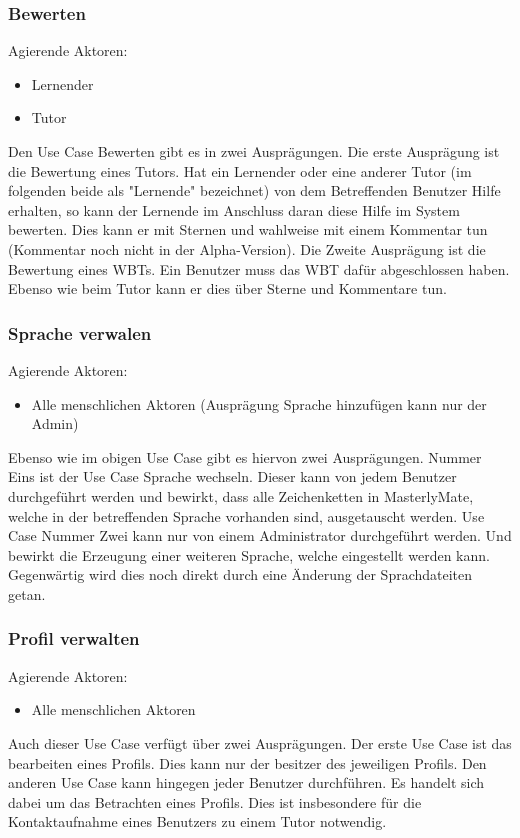 \subsubsection{Bewerten}
Agierende Aktoren: \begin{itemize}
  \item Lernender
  \item Tutor
\end{itemize} 

Den Use Case Bewerten gibt es in zwei Ausprägungen. Die erste Ausprägung ist die
Bewertung eines Tutors. Hat ein Lernender oder eine anderer Tutor (im folgenden
beide als "Lernende" bezeichnet) von dem Betreffenden Benutzer Hilfe erhalten,
so kann der Lernende im Anschluss daran diese Hilfe im System bewerten.
Dies kann er mit Sternen und wahlweise mit einem Kommentar tun (Kommentar noch
nicht in der Alpha-Version). Die Zweite Ausprägung ist die Bewertung eines WBTs.
Ein Benutzer muss das WBT dafür abgeschlossen haben. Ebenso wie beim Tutor kann
er dies über Sterne und Kommentare tun.
	
\subsubsection{Sprache verwalen}
Agierende Aktoren: \begin{itemize}
  \item Alle menschlichen Aktoren (Ausprägung Sprache
hinzufügen kann nur der Admin)
\end{itemize}

Ebenso wie im obigen Use Case gibt es hiervon zwei Ausprägungen.
Nummer Eins ist der Use Case Sprache wechseln. Dieser kann von jedem Benutzer
durchgeführt werden und bewirkt, dass alle Zeichenketten in MasterlyMate, welche
in der betreffenden Sprache vorhanden sind, ausgetauscht werden. Use Case Nummer
Zwei kann nur von einem Administrator durchgeführt werden. Und bewirkt die
Erzeugung einer weiteren Sprache, welche eingestellt werden kann. Gegenwärtig
wird dies noch direkt durch eine Änderung der Sprachdateiten getan.

\subsubsection{Profil verwalten}
Agierende Aktoren: \begin{itemize}
  \item Alle menschlichen Aktoren
\end{itemize}

Auch dieser Use Case verfügt über zwei Ausprägungen. Der erste Use Case ist das
bearbeiten eines Profils. Dies kann nur der besitzer des jeweiligen Profils.
Den anderen Use Case kann hingegen jeder Benutzer durchführen. Es handelt sich
dabei um das Betrachten eines Profils. Dies ist insbesondere für die
Kontaktaufnahme eines Benutzers zu einem Tutor notwendig.

